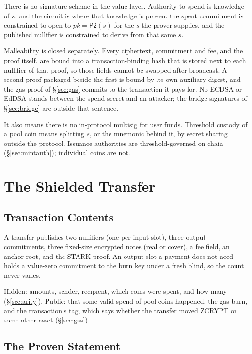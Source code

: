 \documentclass[twocolumn,10pt]{article}
\begin{document}
There is no signature scheme in the value layer. Authority to spend is knowledge of $s$, and the circuit is where that knowledge is proven: the spent commitment is constrained to open to $\mathit{pk}=\mathsf{P2}(s)$ for the $s$ the prover supplies, and the published nullifier is constrained to derive from that same $s$.

Malleability is closed separately. Every ciphertext, commitment and fee, and the proof itself, are bound into a transaction-binding hash that is stored next to each nullifier of that proof, so those fields cannot be swapped after broadcast. A second proof packaged beside the first is bound by its own auxiliary digest, and the gas proof of \S\ref{sec:gas} commits to the transaction it pays for. No ECDSA or EdDSA stands between the spend secret and an attacker; the bridge signatures of \S\ref{sec:bridge} are outside that sentence.

It also means there is no in-protocol multisig for user funds. Threshold custody of a pool coin means splitting $s$, or the mnemonic behind it, by secret sharing outside the protocol. Issuance authorities are threshold-governed on chain (\S\ref{sec:mintauth}); individual coins are not.

\section{The Shielded Transfer}
\label{sec:transfer}

\subsection{Transaction Contents}

A transfer publishes two nullifiers (one per input slot), three output commitments, three fixed-size encrypted notes (real or cover), a fee field, an anchor root, and the STARK proof. An output slot a payment does not need holds a value-zero commitment to the burn key under a fresh blind, so the count never varies.

Hidden: amounts, sender, recipient, which coins were spent, and how many (\S\ref{sec:arity}). Public: that some valid spend of pool coins happened, the gas burn, and the transaction's tag, which says whether the transfer moved ZCRYPT or some other asset (\S\ref{sec:gas}).

\subsection{The Proven Statement}
\end{document}
